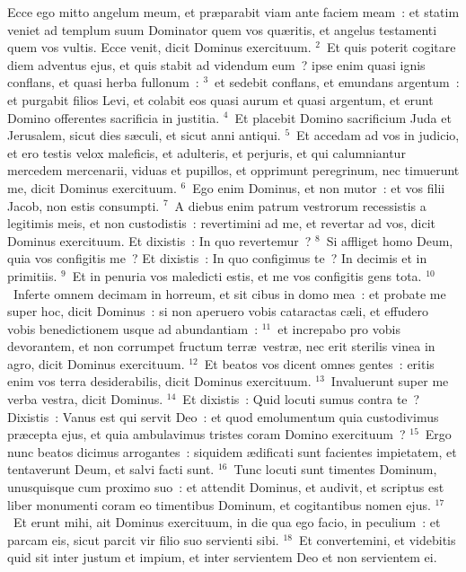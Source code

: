 \lettrine[lines=10,image=true,loversize=0.05,lraise=-0.03]{E}{}cce ego mitto angelum meum, et pr\ae parabit viam ante faciem meam~: et statim veniet ad templum suum Dominator quem vos qu\ae ritis, et angelus testamenti quem vos vultis. Ecce venit, dicit Dominus exercituum.
${}^{2}$~Et quis poterit cogitare diem adventus ejus, et quis stabit ad videndum eum~? ipse enim quasi ignis conflans, et quasi herba fullonum~:
${}^{3}$~et sedebit conflans, et emundans argentum~: et purgabit filios Levi, et colabit eos quasi aurum et quasi argentum, et erunt Domino offerentes sacrificia in justitia.
${}^{4}$~Et placebit Domino sacrificium Juda et Jerusalem, sicut dies s\ae culi, et sicut anni antiqui.
${}^{5}$~Et accedam ad vos in judicio, et ero testis velox maleficis, et adulteris, et perjuris, et qui calumniantur mercedem mercenarii, viduas et pupillos, et opprimunt peregrinum, nec timuerunt me, dicit Dominus exercituum.
${}^{6}$~Ego enim Dominus, et non mutor~: et vos filii Jacob, non estis consumpti.
${}^{7}$~A diebus enim patrum vestrorum recessistis a legitimis meis, et non custodistis~: revertimini ad me, et revertar ad vos, dicit Dominus exercituum. Et dixistis~: In quo revertemur~?
${}^{8}$~Si affliget homo Deum, quia vos configitis me~? Et dixistis~: In quo configimus te~? In decimis et in primitiis.
${}^{9}$~Et in penuria vos maledicti estis, et me vos configitis gens tota.
${}^{10}$~Inferte omnem decimam in horreum, et sit cibus in domo mea~: et probate me super hoc, dicit Dominus~: si non aperuero vobis cataractas c\ae li, et effudero vobis benedictionem usque ad abundantiam~:
${}^{11}$~et increpabo pro vobis devorantem, et non corrumpet fructum terr\ae\ vestr\ae , nec erit sterilis vinea in agro, dicit Dominus exercituum.
${}^{12}$~Et beatos vos dicent omnes gentes~: eritis enim vos terra desiderabilis, dicit Dominus exercituum.
${}^{13}$~Invaluerunt super me verba vestra, dicit Dominus.
${}^{14}$~Et dixistis~: Quid locuti sumus contra te~? Dixistis~: Vanus est qui servit Deo~: et quod emolumentum quia custodivimus pr\ae cepta ejus, et quia ambulavimus tristes coram Domino exercituum~?
${}^{15}$~Ergo nunc beatos dicimus arrogantes~: siquidem \ae dificati sunt facientes impietatem, et tentaverunt Deum, et salvi facti sunt.
${}^{16}$~Tunc locuti sunt timentes Dominum, unusquisque cum proximo suo~: et attendit Dominus, et audivit, et scriptus est liber monumenti coram eo timentibus Dominum, et cogitantibus nomen ejus.
${}^{17}$~Et erunt mihi, ait Dominus exercituum, in die qua ego facio, in peculium~: et parcam eis, sicut parcit vir filio suo servienti sibi.
${}^{18}$~Et convertemini, et videbitis quid sit inter justum et impium, et inter servientem Deo et non servientem ei.

